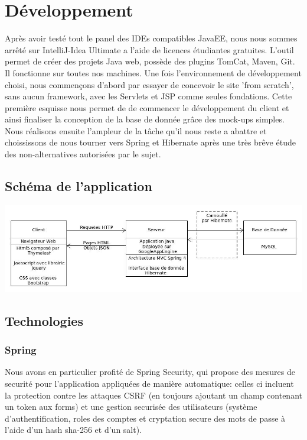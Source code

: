 \section{Développement}
Après avoir testé tout le panel des IDEs compatibles JavaEE, nous nous sommes arrêté sur IntelliJ-Idea Ultimate a l'aide de licences étudiantes gratuites.
L'outil permet de créer des projets Java web, possède des plugins TomCat, Maven, Git. Il fonctionne sur toutes nos machines.
Une fois l'environnement de développement choisi, nous commençons d'abord par essayer de concevoir le site 'from scratch', sans aucun framework, avec les Servlets et JSP comme seules fondations.
Cette première esquisse nous permet de de commencer le développement du client et ainsi finaliser la conception de la base de donnée grâce des mock-ups simples.
Nous réalisons ensuite l'ampleur de la tâche qu'il nous reste a abattre et choississons de nous tourner vers Spring et Hibernate après une très brêve étude des non-alternatives autorisées par le sujet.

\subsection{Schéma de l'application}

\includegraphics[width=\linewidth]{ApplicationSchema.jpg}

\subsection{Technologies}

\subsubsection{Spring}
Nous avons en particulier profité de Spring Security, qui propose des mesures de securité pour l'application appliquées de manière automatique: celles ci incluent la protection contre les attaques CSRF (en toujours ajoutant un champ contenant un token aux forms) et une gestion securisée des utilisateurs (système d'authentification, roles des comptes et cryptation secure des mots de passe à l'aide d'un hash sha-256 et d'un salt).

